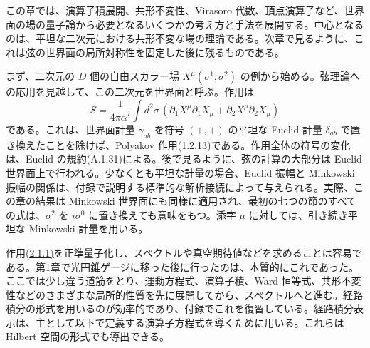 \label{ch:2}

この章では、演算子積展開、共形不変性、Virasoro 代数、頂点演算子など、世界面の場の量子論から必要となるいくつかの考え方と手法を展開する。中心となるのは、平坦な二次元における共形不変な場の理論である。次章で見るように、これは弦の世界面の局所対称性を固定した後に残るものである。

\label{sec:2.1}

まず、二次元の $D$ 個の自由スカラー場 $X^\mu(\sigma^1,\sigma^2)$ の例から始める。弦理論への応用を見越して、この二次元を世界面と呼ぶ。作用は
\begin{equation}
S=\frac{1}{4\pi\alpha'}\int d^2\sigma\,
\left(\partial_1X^\mu\partial_1X_\mu+\partial_2X^\mu\partial_2X_\mu\right)
\tag{2.1.1}\label{eq:2.1.1}
\end{equation}
である。これは、世界面計量 $\gamma_{ab}$ を符号 $(+,+)$ の平坦な Euclid 計量 $\delta_{ab}$ で置き換えたことを除けば、Polyakov 作用\hyperref[eq:1.2.13]{(1.2.13)}である。作用全体の符号の変化は、Euclid の規約(A.1.31)による。後で見るように、弦の計算の大部分は Euclid 世界面上で行われる。少なくとも平坦な計量の場合、Euclid 振幅と Minkowski 振幅の関係は、付録で説明する標準的な解析接続によって与えられる。実際、この章の結果は Minkowski 世界面にも同様に適用され、最初の七つの節のすべての式は、$\sigma^2$ を $i\sigma^0$ に置き換えても意味をもつ。添字 $\mu$ に対しては、引き続き平坦な Minkowski 計量を用いる。

作用\hyperref[eq:2.1.1]{(2.1.1)}を正準量子化し、スペクトルや真空期待値などを求めることは容易である。第1章で光円錐ゲージに移った後に行ったのは、本質的にこれであった。ここでは少し違う道筋をとり、運動方程式、演算子積、Ward 恒等式、共形不変性などのさまざまな局所的性質を先に展開してから、スペクトルへと進む。経路積分の形式を用いるのが効率的であり、付録でこれを復習している。経路積分表示は、主として以下で定義する演算子方程式を導くために用いる。これらは Hilbert 空間の形式でも導出できる。

